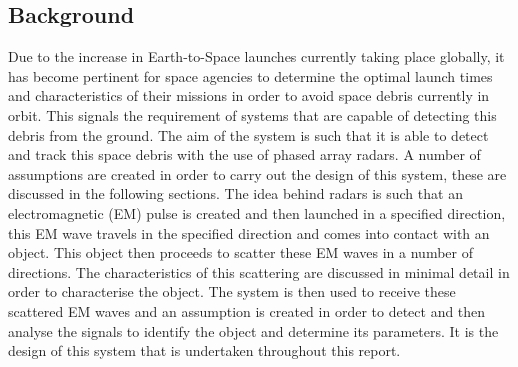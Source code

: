 \documentclass[11pt]{witseiepaper}
\begin{document}

\subsection{Background} \label{sec:Background}
Due to the increase in Earth-to-Space launches currently taking place globally, it has become pertinent for space agencies to determine the optimal launch times and characteristics of their missions in order to avoid space debris currently in orbit. This signals the requirement of systems that are capable of detecting this debris from the ground.
The aim of the system is such that it is able to detect and track this space debris with the use of phased array radars.
A number of assumptions are created in order to carry out the design of this system, these are discussed in the following sections.
The idea behind radars is such that an electromagnetic (EM) pulse is created and then launched in a specified direction, this EM wave travels in the specified direction and comes into contact with an object. This object then proceeds to scatter these EM waves in a number of directions. The characteristics of this scattering are discussed in minimal detail in order to characterise the object. 
The system is then used to receive these scattered EM waves and an assumption is created in order to detect and then analyse the signals to identify the object and determine its parameters.
It is the design of this system that is undertaken throughout this report. 
\end{document}
